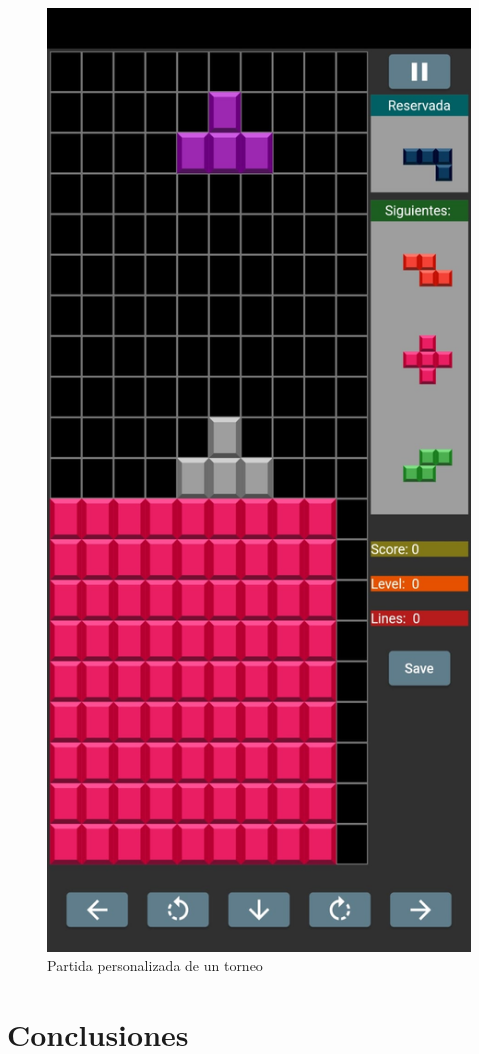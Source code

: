 \documentclass{article}
\begin{document}
\begin{figure}[H]
  \includegraphics[width=\textwidth]{imagenes/piezasRosas.jpeg}
  \caption{Partida personalizada de un torneo} 
\end{figure}
\section{Conclusiones}
\end{document}
